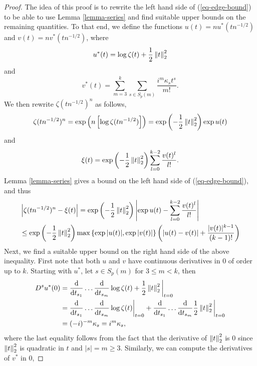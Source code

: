 \begin{proof}
    The idea of this proof is to rewrite the left hand side of (\ref{eq-edge-bound}) to be able to use Lemma \ref{lemma-series} and find suitable upper bounds on the remaining quantities. To that end, we define the functions $u(t) = n u^*(t n^{-1/2})$ and $v(t) = nv^*(t n^{-1/2})$, where
    \begin{equation*}
        u^*(t) = \log \zeta(t) + \frac{1}{2}\left\lVert t\right\rVert_2^2
    \end{equation*}
    and 
    \begin{equation*}
        v^*(t) = \sum_{m=3}^k \sum_{s \in S_p(m)} \frac{i^m\kappa_s t^s}{m!}.
    \end{equation*}
    We then rewrite $\zeta(t n^{-1/2})^n$ as follows,
    \begin{equation*}
        \zeta(t n^{-1/2})^n = \exp\left(n\left[\log \zeta(t n^{-1/2})\right]\right) = \exp\left(-\frac{1}{2}\left\lVert t\right\rVert_2^2\right)\exp u(t)
    \end{equation*}
    and
    \begin{equation*}
        \xi(t) = \exp\left(-\frac{1}{2}\left\lVert t\right\rVert_2^2\right)\sum_{l=0}^{k-2} \frac{v(t)^l}{l!}.
    \end{equation*}
    Lemma \ref{lemma-series} gives a bound on the left hand side of (\ref{eq-edge-bound}), and thus
    \begin{align*}
        &\left|\zeta(t n^{-1/2})^n - \xi(t)\right| 
        = \exp\left(-\frac{1}{2}\left\lVert t\right\rVert_2^2\right)\left|\exp u(t) - \sum_{l=0}^{k-2} \frac{v(t)^l}{l!}\right|\\
        &\leq \exp\left(-\frac{1}{2}\left\lVert t\right\rVert_2^2\right) \max \left\{ \exp{|u(t)|}, \exp{|v(t)|} \right\}\left(\left|u(t) - v(t)\right| + \frac{|v(t)|^{k-1}}{(k-1)!}\right)
    \end{align*}
    Next, we find a suitable upper bound on the right hand side of the above inequality. First note that both $u$ and $v$ have continuous derivatives in 0 of order up to $k$. Starting with $u^*$, let $s \in S_p(m)$ for $3 \leq m < k$, then
    \begin{align*}
        D^s u^*(0)
        &= \frac{\text{d}}{\text{d} t_{s_1}}\ldots\frac{\text{d}}{\text{d} t_{s_m}} \log \zeta(t) + \frac{1}{2}\left\lVert t\right\rVert_2^2\bigg|_{t=0}\\
        &=  \frac{\text{d}}{\text{d} t_{s_1}}\ldots\frac{\text{d}}{\text{d} t_{s_m}} \log \zeta(t)\bigg|_{t=0}
            +
            \frac{\text{d}}{\text{d} t_{s_1}}\ldots\frac{\text{d}}{\text{d} t_{s_m}} \frac{1}{2}\left\lVert t\right\rVert_2^2\bigg|_{t=0}
        \\
        &= (-i)^{-m}\kappa_s = i^m \kappa_s ,
    \end{align*}
    where the last equality follows from the fact that the derivative of $\left\lVert t\right\rVert_2^2$ is 0 since $\left\lVert t\right\rVert_2^2$ is quadratic in $t$ and $|s| = m \geq 3$. Similarly, we can compute the derivatives of $v^*$ in 0,

\end{proof}
